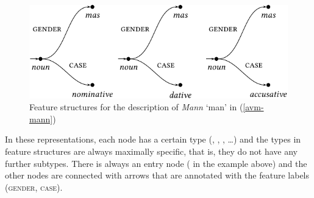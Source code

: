 \begin{figure}
\centerline{%
\includegraphics{Figures/mann-model-theoretic-crop}
}
\caption{\label{abb-avm-mann}Feature structures for the description of \emph{Mann} `man' in  (\ref{avm-mann})}
\end{figure}%
In these representations, each node has a certain type (, , ,
\ldots) and the types in feature structures are always maximally specific, that is, they do not have
any further subtypes. There is always an entry node ( in the example above) and the other
nodes are connected with arrows that are annotated with the feature labels (\textsc{gender}, \textsc{case}).

